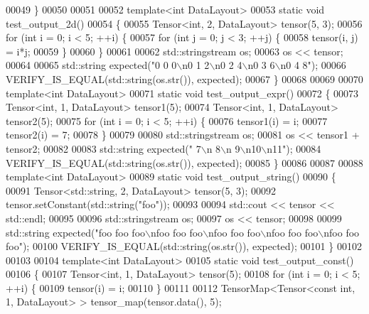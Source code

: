 \begin{DoxyCode}
00049 \}
00050 
00051 
00052 \textcolor{keyword}{template}<\textcolor{keywordtype}{int} DataLayout>
00053 \textcolor{keyword}{static} \textcolor{keywordtype}{void} test\_output\_2d()
00054 \{
00055   Tensor<int, 2, DataLayout> tensor(5, 3);
00056   \textcolor{keywordflow}{for} (\textcolor{keywordtype}{int} i = 0; i < 5; ++i) \{
00057     \textcolor{keywordflow}{for} (\textcolor{keywordtype}{int} j = 0; j < 3; ++j) \{
00058       tensor(i, j) = i*j;
00059     \}
00060   \}
00061 
00062   std::stringstream os;
00063   os << tensor;
00064 
00065   std::string expected(\textcolor{stringliteral}{"0  0  0\(\backslash\)n0  1  2\(\backslash\)n0  2  4\(\backslash\)n0  3  6\(\backslash\)n0  4  8"});
00066   VERIFY\_IS\_EQUAL(std::string(os.str()), expected);
00067 \}
00068 
00069 
00070 \textcolor{keyword}{template}<\textcolor{keywordtype}{int} DataLayout>
00071 \textcolor{keyword}{static} \textcolor{keywordtype}{void} test\_output\_expr()
00072 \{
00073   Tensor<int, 1, DataLayout> tensor1(5);
00074   Tensor<int, 1, DataLayout> tensor2(5);
00075   \textcolor{keywordflow}{for} (\textcolor{keywordtype}{int} i = 0; i < 5; ++i) \{
00076     tensor1(i) = i;
00077     tensor2(i) = 7;
00078   \}
00079 
00080   std::stringstream os;
00081   os << tensor1 + tensor2;
00082 
00083   std::string expected(\textcolor{stringliteral}{" 7\(\backslash\)n 8\(\backslash\)n 9\(\backslash\)n10\(\backslash\)n11"});
00084   VERIFY\_IS\_EQUAL(std::string(os.str()), expected);
00085 \}
00086 
00087 
00088 \textcolor{keyword}{template}<\textcolor{keywordtype}{int} DataLayout>
00089 \textcolor{keyword}{static} \textcolor{keywordtype}{void} test\_output\_string()
00090 \{
00091   Tensor<std::string, 2, DataLayout> tensor(5, 3);
00092   tensor.setConstant(std::string(\textcolor{stringliteral}{"foo"}));
00093 
00094   std::cout << tensor << std::endl;
00095 
00096   std::stringstream os;
00097   os << tensor;
00098 
00099   std::string expected(\textcolor{stringliteral}{"foo  foo  foo\(\backslash\)nfoo  foo  foo\(\backslash\)nfoo  foo  foo\(\backslash\)nfoo  foo  foo\(\backslash\)nfoo  foo  foo"});
00100   VERIFY\_IS\_EQUAL(std::string(os.str()), expected);
00101 \}
00102 
00103 
00104 \textcolor{keyword}{template}<\textcolor{keywordtype}{int} DataLayout>
00105 \textcolor{keyword}{static} \textcolor{keywordtype}{void} test\_output\_const()
00106 \{
00107   Tensor<int, 1, DataLayout> tensor(5);
00108   \textcolor{keywordflow}{for} (\textcolor{keywordtype}{int} i = 0; i < 5; ++i) \{
00109     tensor(i) = i;
00110   \}
00111 
00112   TensorMap<Tensor<const int, 1, DataLayout> > tensor\_map(tensor.data(), 5);

\end{DoxyCode}
